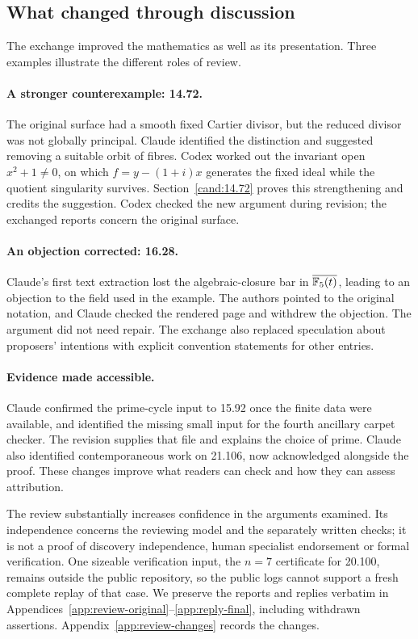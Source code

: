 \subsection{What changed through discussion}

The exchange improved the mathematics as well as its presentation.
Three examples illustrate the different roles of review.

\paragraph{A stronger counterexample: 14.72.}
The original surface had a smooth fixed Cartier divisor, but the reduced
divisor was not globally principal. Claude identified the distinction
and suggested removing a suitable orbit of fibres. Codex worked out
the invariant open \(x^2+1\ne0\), on which
\(f=y-(1+i)x\) generates the fixed ideal while the quotient singularity
survives. Section~\ref{cand:14.72} proves this strengthening and credits
the suggestion. Codex checked the new argument during revision; the exchanged reports
concern the original surface.

\paragraph{An objection corrected: 16.28.}
Claude's first text extraction lost the algebraic-closure bar in
\(\overline{\mathbb F_5(t)}\), leading to an objection to the field used in
the example. The authors pointed to the original notation, and Claude
checked the rendered page and withdrew the objection. The argument did
not need repair. The exchange also replaced speculation about proposers'
intentions with explicit convention statements for other entries.

\paragraph{Evidence made accessible.}
Claude confirmed the prime-cycle input to 15.92 once the finite data
were available, and identified the missing small input for the fourth
ancillary carpet checker. The revision supplies that file and explains
the choice of prime. Claude also identified contemporaneous work on
21.106, now acknowledged alongside the proof. These changes improve
what readers can check and how they can assess attribution.

The review substantially increases confidence in the arguments examined.
Its independence concerns the reviewing model and the separately written
checks; it is not a proof of discovery independence, human specialist
endorsement or formal verification. One sizeable verification input,
the \(n=7\) certificate for 20.100, remains outside the public repository,
so the public logs cannot support a fresh complete replay of that case.
We preserve the reports and replies verbatim in
Appendices~\ref{app:review-original}--\ref{app:reply-final}, including
withdrawn assertions. Appendix~\ref{app:review-changes} records the changes.
